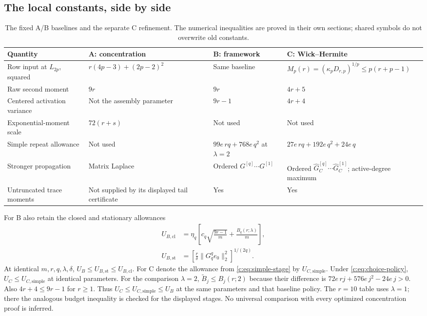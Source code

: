 \documentclass[11pt]{article}
\numberwithin{equation}{section}
\theoremstyle{definition}\newtheorem{definition}[theorem]{Definition}
\theoremstyle{remark}\newtheorem{remark}[theorem]{Remark}
\begin{document}
\subsection{The local constants, side by side}
\begin{table}[H]\centering\small
\setlength{\tabcolsep}{4pt}\renewcommand{\arraystretch}{1.18}
\begin{tabularx}{\textwidth}{@{}P{.22\textwidth}YYY@{}}
\toprule
\textbf{Quantity}&\textbf{A: concentration}&\textbf{B: framework}&\textbf{C: Wick--Hermite}\\
\midrule
Row input at $L_{2p}$, squared&
$r(4p-3)+(2p-2)^2$&Same baseline&
$M_p(r)=(\kappa_pD_{r,p})^{1/p}\le p(r+p-1)$\\[3pt]
Raw second moment&$9r$&$9r$&$4r+5$\\[3pt]
Centered activation variance&Not the assembly parameter&$9r-1$&$4r+4$\\[3pt]
Exponential-moment scale&$72(r+s)$&Not used&Not used\\[3pt]
Simple repeat allowance&Not used&
$99e\,rq+768e\,q^2$ at $\lambda=2$&
$27e\,rq+192e\,q^2+24e\,q$\\[3pt]
Stronger propagation&Matrix Laplace&
Ordered $G^{[q]}\cdots G^{[1]}$&
Ordered $\widehat G_C^{[q]}\cdots\widehat G_C^{[1]}$; active-degree maximum\\[3pt]
Untruncated trace moments&Not supplied by its displayed tail certificate&Yes&Yes\\
\bottomrule
\end{tabularx}
\caption{The fixed A/B baselines and the separate C refinement. The numerical
inequalities are proved in their own sections; shared symbols do not overwrite
old constants.}\label{tab:three-constants}
\end{table}

For B also retain the closed and stationary allowances
\begin{align}
 U_{B,\mathrm{cl}}&=\eta_q\left[c_q\sqrt{\frac{9r-1}{m}}+
 \frac{B_q(r;\lambda)}m\right],\label{eq:UBclosed}\\
 U_{B,\mathrm{st}}&=\left[\frac r\delta\|G_q^qe_0\|_2^2\right]^{1/(2q)}.
 \label{eq:UBstatic}
\end{align}
At identical $m,r,q,\lambda,\delta$,
$U_B\le U_{B,\mathrm{st}}\le U_{B,\mathrm{cl}}$.
For C denote the allowance from \eqref{c:eq:simple-stage} by
$U_{C,\mathrm{simple}}$. Under \eqref{c:eq:choice-policy},
$U_C\le U_{C,\mathrm{simple}}$ at identical parameters. For the comparison
$\lambda=2$, $\widetilde B_j\le B_j(r;2)$ because their difference is
$72e\,rj+576e\,j^2-24e\,j>0$. Also $4r+4\le9r-1$ for $r\ge1$.
Thus $U_C\le U_{C,\mathrm{simple}}\le U_B$ at the same parameters and that
baseline policy. The $r=10$ table uses $\lambda=1$; there the analogous
budget inequality is checked for the displayed stages. No universal comparison
with every optimized concentration proof is inferred.
\end{document}
